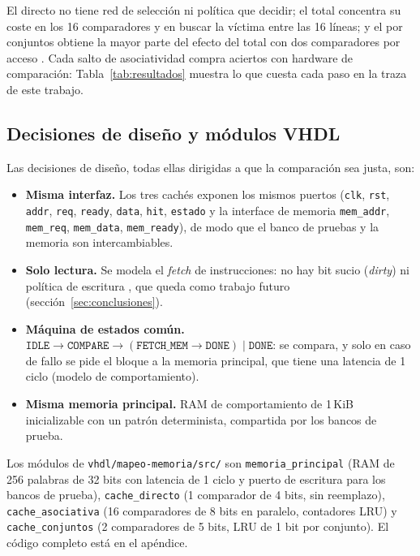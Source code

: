 \documentclass[llncs]{llncs}
\begin{document}
El directo no tiene red de selección ni política que decidir; el
total concentra su coste en los 16 comparadores y en buscar la
víctima entre las 16 líneas; y el por conjuntos obtiene la mayor
parte del efecto del total con dos comparadores por acceso
\cite{hennessy2019,wikipedia-cpu-cache}. Cada salto de asociatividad
compra aciertos con hardware de comparación:
Tabla~\ref{tab:resultados} muestra lo que cuesta cada paso en la
traza de este trabajo.

\subsection{Decisiones de diseño y módulos VHDL}

Las decisiones de diseño, todas ellas dirigidas a que la comparación
sea justa, son:
\begin{itemize}
  \item \textbf{Misma interfaz.} Los tres cachés exponen los mismos
    puertos (\texttt{clk}, \texttt{rst}, \texttt{addr}, \texttt{req},
    \texttt{ready}, \texttt{data}, \texttt{hit}, \texttt{estado} y la
    interface de memoria \texttt{mem\_addr}, \texttt{mem\_req},
    \texttt{mem\_data}, \texttt{mem\_ready}), de modo que el banco de
    pruebas y la memoria son intercambiables.
  \item \textbf{Solo lectura.} Se modela el \emph{fetch} de
    instrucciones: no hay bit sucio (\emph{dirty}) ni política de
    escritura \cite{wikipedia-cache-computing}, que queda como trabajo
    futuro (sección~\ref{sec:conclusiones}).
  \item \textbf{Máquina de estados común.}
    $\texttt{IDLE} \rightarrow \texttt{COMPARE} \rightarrow
    (\texttt{FETCH\_MEM} \rightarrow \texttt{DONE}) \mid
    \texttt{DONE}$: se compara, y solo en caso de fallo se pide el
    bloque a la memoria principal, que tiene una latencia de 1 ciclo
    (modelo de comportamiento).
  \item \textbf{Misma memoria principal.} RAM de comportamiento de
    1\,KiB inicializable con un patrón determinista, compartida por
    los bancos de prueba.
\end{itemize}

Los módulos de \texttt{vhdl/mapeo-memoria/src/} son
\texttt{memoria\_principal} (RAM de 256 palabras de 32 bits con
latencia de 1 ciclo y puerto de escritura para los bancos de prueba),
\texttt{cache\_directo} (1 comparador de 4 bits, sin reemplazo),
\texttt{cache\_asociativa} (16 comparadores de 8 bits en paralelo,
contadores LRU) y \texttt{cache\_conjuntos} (2 comparadores de 5
bits, LRU de 1 bit por conjunto). El código completo está en el
apéndice.
\end{document}
